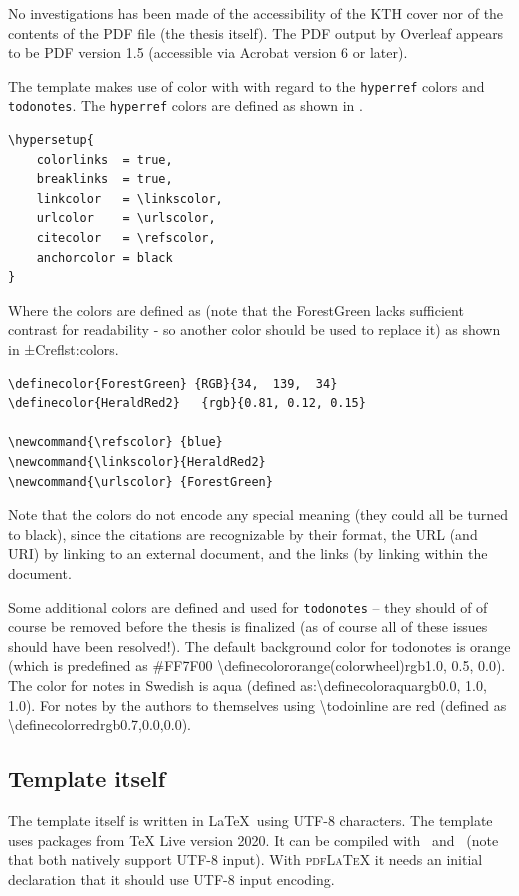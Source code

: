 No investigations has been made of the accessibility of the KTH cover nor of the contents of the PDF file (\ie the thesis itself). The PDF output by Overleaf appears to be PDF version 1.5 (\ie accessible via Acrobat version 6 or later).

The template makes use of color with with regard to the \texttt{hyperref} colors and \texttt{todonotes}. The \texttt{hyperref} colors are defined as shown in .
\begin{lstlisting}[language={[LaTeX]TeX}, caption={\textbackslash hypersetup}, label=lst:setupHyperRef]
\hypersetup{
	colorlinks  = true,
	breaklinks  = true,
	linkcolor   = \linkscolor,
	urlcolor    = \urlscolor,
	citecolor   = \refscolor,
	anchorcolor = black
}
\end{lstlisting}
Where the colors are defined as (note that the ForestGreen lacks sufficient contrast for readability - so another color should be used to replace it) as shown in ±Cref{lst:colors}.
\begin{lstlisting}[language={[LaTeX]TeX}, caption={Some colors for hyper references }, label=lst:colors]
\definecolor{ForestGreen} {RGB}{34,  139,  34}
\definecolor{HeraldRed2}   {rgb}{0.81, 0.12, 0.15}

\newcommand{\refscolor} {blue}
\newcommand{\linkscolor}{HeraldRed2}
\newcommand{\urlscolor} {ForestGreen}
\end{lstlisting}

Note that the colors do not encode any special meaning (\ie they could all be turned to black), since the citations are recognizable by their format, the URL (and URI) by linking to an external document, and the links (by linking within the document.

Some additional colors are defined and used for \texttt{todonotes} – they should of of course be removed before the thesis is finalized (as of course all of these issues should have been resolved!). The default background color for todonotes is orange (which is predefined as \#FF7F00 \textbackslash definecolor{orange(colorwheel)}{rgb}{1.0, 0.5, 0.0}). The color for notes in Swedish is aqua (defined as:\textbackslash definecolor{aqua}{rgb}{0.0, 1.0, 1.0}). For notes by the authors to themselves using \textbackslash todoinline are red (defined as \textbackslash definecolor{red}{rgb}{0.7,0.0,0.0}). 

\subsection{Template itself}
\label{sec:ccessibilityOfTemplateItself}
The template itself is written in \LaTeX~using UTF-8 characters. The template uses packages from TeX Live version 2020. It can be compiled with \XeLaTeX~and \LuaLaTeX~(note that both natively support UTF-8 input). With \textsc{pdfLaTeX} it needs an initial declaration that it should use UTF-8 input encoding.

